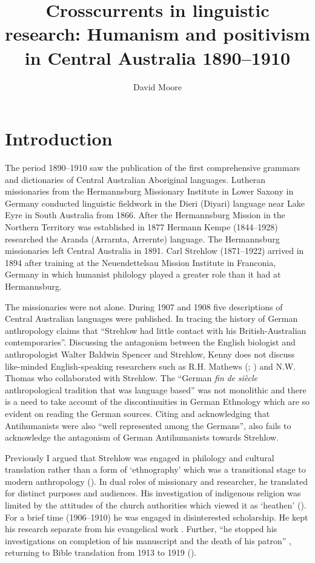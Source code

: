 \documentclass[output=paper]{../langscibook}
\author{David Moore\affiliation{University of Western Australia}\orcid{}}
\title{Crosscurrents in linguistic research: Humanism and positivism in Central Australia 1890--1910}
\begin{document}
\maketitle

\section{Introduction} 

 The period 1890--1910 saw the publication of the first comprehensive grammars and dictionaries of Central  Australian Aboriginal languages. Lutheran missionaries from the Hermannsburg Missionary Institute in Lower Saxony in Germany conducted linguistic fieldwork in the Dieri (Diyari) language near Lake Eyre in South Australia from 1866. After the Hermannsburg Mission in the Northern Territory was established in 1877 Hermann Kempe (1844--1928) researched the Aranda (Arrarnta, Arrernte) language. The Hermannsburg missionaries left Central Australia in 1891. Carl Strehlow (1871--1922) arrived in 1894 after training at the Neuendettelsau Mission Institute in Franconia, Germany in which humanist philology played a greater role than it had at Hermannsburg.
 
 The missionaries were not alone. During 1907 and 1908 five descriptions of Central Australian languages were published. In tracing the history of German anthropology \citet[51]{kenny_arandas_2013} claims that “Strehlow had little contact with his British-Australian contemporaries”. Discussing the antagonism between the English biologist and anthropologist Walter Baldwin Spencer and Strehlow, Kenny does not discuss like-minded English-speaking researchers such as R.H. Mathews (\citealt{mathews_arranda_1907}; \citealt{thomas_culture_2007}) and N.W. Thomas who collaborated with Strehlow. The “German \textit{fin} \textit{de} \textit{siècle} anthropological tradition that was language based” \citep[99]{kenny_arandas_2013} was not monolithic and there is a need to take account of the discontinuities in German Ethnology which are so evident on reading the German sources. Citing \citet{monteath_globalising_2013} and acknowledging that Antihumanists were also “well represented among the Germans”, \citet[228]{kenny_arandas_2013} also fails to acknowledge the antagonism of German Antihumanists towards Strehlow.
 
 Previously I argued that Strehlow was engaged in philology and cultural translation rather than a form of ‘ethnography’ which was a transitional stage to modern anthropology (\citealt[336]{harding_indigenous_2018}). In dual roles of missionary and researcher, he translated for distinct purposes and audiences. His investigation of indigenous religion was limited by the attitudes of the church authorities which viewed it as ‘heathen’ (\citealt[338]{harding_indigenous_2018}).  For a brief time (1906--1910) he was engaged in disinterested scholarship. He kept his research separate from his evangelical work \citep[232]{brock_evangelism_2017}. Further, “he stopped his investigations on completion of his manuscript and the death of his patron” \citep[236]{brock_evangelism_2017}, returning to Bible translation from 1913 to 1919 (\citealt[336]{harding_indigenous_2018}).
 
\end{document}
